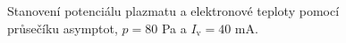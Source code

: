 \documentclass[a4paper,12pt]{article}
\begin{document}
\newpage
\begin{figure}[h]
	\centering
	\begin{subfigure}[b]{.49\textwidth}
		\centering
	\end{subfigure}
	\begin{subfigure}[b]{.49\textwidth}
		\centering
	\end{subfigure}
	\caption{Stanovení potenciálu plazmatu a elektronové teploty pomocí 
		průsečíku asymptot, $p = 80$ \si{\pascal} a $I_\text{v} = 40$ 
		\si{\milli\ampere}.}
	\label{data4}
\end{figure}
\end{document}
